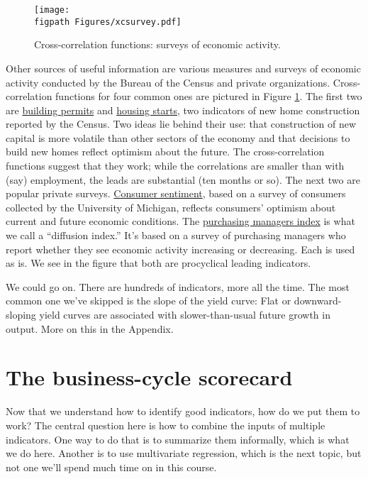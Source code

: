 \begin{figure}
     \caption{Cross-correlation functions:  surveys of economic activity.}
    \label{fig:ccf-survey}%
    \centering
    \texttt{[image: \\figpath Figures/xcsurvey.pdf]}
\end{figure}

Other sources of useful information are various measures and surveys
of economic activity conducted by the Bureau of the Census and
private organizations.
Cross-correlation functions for four common ones are pictured in
Figure \ref{fig:ccf-survey}.
The first two are \href{http://research.stlouisfed.org/fred2/series/PERMIT}{building permits} and \href{http://research.stlouisfed.org/fred2/series/HOUST}{housing starts},
two indicators of new home construction reported by the Census.
Two ideas lie behind their use:
that construction of new capital is more volatile than other sectors
of the economy
and that decisions to build new homes reflect optimism about the future.
The cross-correlation functions suggest that they work;
while the correlations are
smaller than with (say) employment, the leads are substantial
(ten months or so).
The next two are popular private surveys.
\href{http://research.stlouisfed.org/fred2/series/UMCSENT}{Consumer sentiment},
based on a survey of consumers
collected by the University of Michigan, reflects consumers' optimism about current and future economic conditions.
The \href{http://research.stlouisfed.org/fred2/series/NAPM}{purchasing managers index} is what we call a ``diffusion index.''
It's based on a survey of purchasing managers who report whether
they see economic activity increasing or decreasing.
Each is used as is.
We see in the figure that both are procyclical 
 leading indicators.

We could go on.  There are hundreds of indicators, more all the time.
The most common one we've skipped is the slope of the yield 
 curve:
Flat or downward-sloping yield 
 curves are associated with slower-than-usual
future growth in output. More on this in the Appendix.


\section{The business-cycle scorecard }

Now that we understand how to identify good indicators,
how do we put them to work?
The central question here is how to combine the inputs of multiple indicators.
One way to do that is to summarize them informally, which is what we do here.
Another is to use multivariate regression, which is the next topic,
but not one we'll spend much time on in this course.


